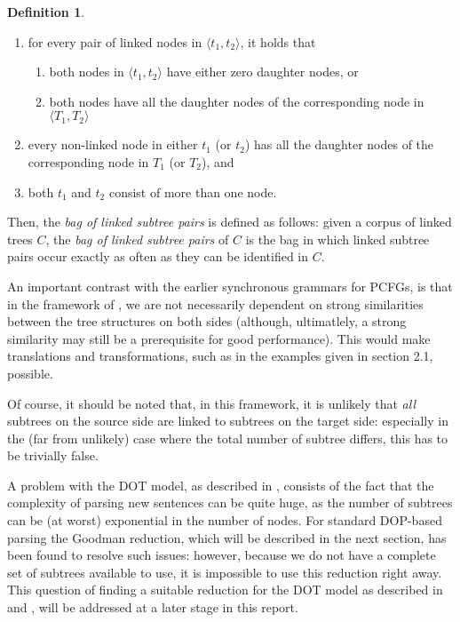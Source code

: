 \documentclass[a4paper]{article}
\theoremstyle{definition}
\newtheorem{definition}[theorem]{Definition}
\begin{document}
{{\begin{definition}
\begin{enumerate}
\item for every pair of linked nodes in $\langle t_1, t_2 \rangle$, it holds that
	\begin{enumerate}
	\item both nodes in $\langle t_1, t_2 \rangle$ have either zero
		daughter nodes, or
	\item both nodes have all the daughter nodes of the corresponding node
		in $\langle T_1, T_2 \rangle$
	\end{enumerate}
\item every non-linked node in either $t_1$ (or $t_2$) has all the daughter
	nodes of the corresponding node in $T_1$ (or $T_2$), and
\item both $t_1$ and $t_2$ consist of more than one node.
\end{enumerate}
\end{definition}

Then, the \emph{bag of linked subtree pairs} is defined as follows: given a
corpus of linked trees $C$, the \emph{bag of linked subtree pairs} of $C$ is
the bag in which linked subtree pairs occur exactly as often as they can be
identified in $C$.

An important contrast with the earlier synchronous grammars for PCFGs, is that
in the framework of \cite{Po}, we are not necessarily dependent on strong
similarities between the tree structures on both sides (although, ultimatlely,
a strong similarity may still be a prerequisite for good performance). This
would make translations and transformations, such as in the examples given in
section 2.1, possible.

Of course, it should be noted that, in this framework, it is unlikely that
\emph{all} subtrees on the source side are linked to subtrees on the target
side: especially in the (far from unlikely) case where the total number of
subtree differs, this has to be trivially false.

A problem with the DOT model, as described in \cite{Po}, consists of the fact
that the complexity of parsing new sentences can be quite huge, as the number
of subtrees can be (at worst) exponential in the number of nodes. For standard
DOP-based parsing the Goodman reduction, which will be described in the next
section, has been found to resolve such issues: however, because we do not have
a complete set of subtrees available to use, it is impossible to use this
reduction right away. This question of finding a suitable reduction for the DOT
model as described in \cite{Po} and \cite{Po2}, will be addressed at a later
stage in this report.

}}
\end{document}
